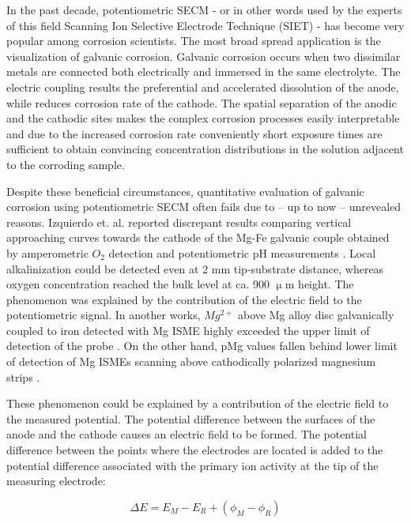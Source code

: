 \documentclass[3p]{elsarticle}
\begin{document}
In the past decade, potentiometric SECM - or in other words used by the experts of this field Scanning Ion Selective Electrode Technique (SIET) - has become very popular among corrosion scientists\cite{lamaka, ZnISME, diamondel, cutedge, H+selective, simulating}. The most broad spread application is the visualization of galvanic corrosion\cite{amperopot, chloride, spatiozn, fezn}.
Galvanic corrosion occurs when two dissimilar metals are connected both electrically and immersed in the same electrolyte. The electric coupling results the preferential and accelerated dissolution of the anode, while reduces corrosion rate of the cathode. The spatial separation of the anodic and the cathodic sites makes the complex corrosion processes easily interpretable and due to the increased corrosion rate conveniently short exposure times are sufficient to obtain convincing concentration distributions in the solution adjacent to the corroding sample.

Despite these beneficial circumstances, quantitative evaluation of galvanic corrosion using potentiometric SECM often fails due to – up to now – unrevealed reasons.
Izquierdo et. al. reported discrepant results comparing vertical approaching curves towards the cathode of the Mg-Fe galvanic couple obtained by amperometric $O_2$ detection and potentiometric pH measurements \cite{pH15}. Local alkalinization could be detected even at 2 mm tip-substrate distance, whereas oxygen concentration reached the bulk level at ca. 900 $\upmu$m height. The phenomenon was explained by the contribution of the electric field to the potentiometric signal.  
In another works, $Mg^{2+}$ above Mg alloy disc galvanically coupled to iron detected with Mg ISME highly exceeded the upper limit of detection of the probe \cite{overmg1, overmg2, overmg3}.
On the other hand, pMg values fallen behind lower limit of detection of Mg ISMEs scanning above cathodically polarized magnesium strips \cite{belowmg}. 

These phenomenon could be explained by a contribution of the electric field to the measured potential. The potential difference between the surfaces of the anode and the cathode causes an electric field to be formed. The potential difference between the points where the electrodes are located is added to the potential difference associated with the primary ion activity at the tip of the measuring electrode:

\begin{equation}
\Delta E=E_M-E_R + (\phi_M - \phi_R)
\label{eq:potential}
\end{equation}
\end{document}
